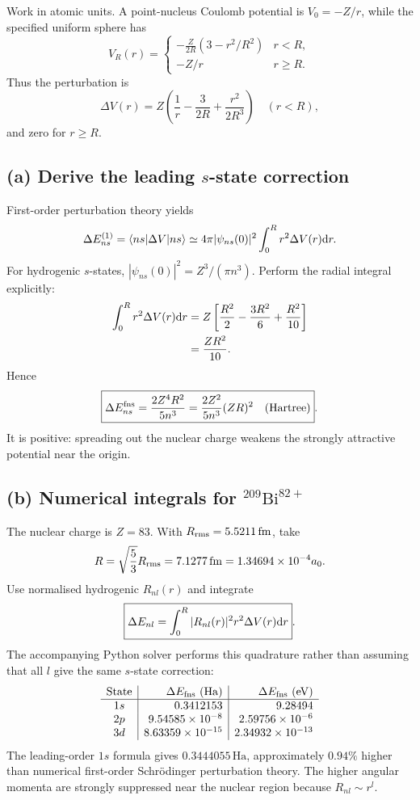 Work in atomic units. A point-nucleus Coulomb potential is
\(V_0=-Z/r\), while the specified uniform sphere has
\[
V_R(r)=
\begin{cases}
-\frac Z{2R}(3-r^2/R^2)&r<R,\\
-Z/r&r\ge R.
\end{cases}
\]
Thus the perturbation is
\[
\Delta V(r)=Z\left(\frac1r-\frac3{2R}
+\frac{r^2}{2R^3}\right)\quad(r<R),
\]
and zero for \(r\ge R\).

\subsection*{(a) Derive the leading \(s\)-state correction}
First-order perturbation theory yields
\[
\Delta E_{ns}^{(1)}
=\left\langle ns\middle\vert \Delta V\middle\vert ns\right\rangle
\simeq4\pi|\psi_{ns}(0)|^2\int_0^R
r^2\Delta V(r)\mathrm{d} r .
\]
For hydrogenic \(s\)-states,
\(|\psi_{ns}(0)|^2=Z^3/(\pi n^3)\).
Perform the radial integral explicitly:
\[
\begin{aligned}
\int_0^R r^2\Delta V(r)\mathrm{d} r
&=Z\left[\frac{R^2}{2}
-\frac{3R^2}{6}+\frac{R^2}{10}\right]\\
&=\frac{ZR^2}{10}.
\end{aligned}
\]
Hence
\[
\boxed{\Delta E_{ns}^{\rm fns}
=\frac{2Z^4R^2}{5n^3}
=\frac{2Z^2}{5n^3}(ZR)^2\quad(\text{Hartree})}.
\]
It is positive: spreading out the nuclear charge
weakens the strongly attractive potential near the origin.

\subsection*{(b) Numerical integrals for \(^{209}\mathrm{Bi}^{82+}\)}
The nuclear charge is \(Z=83\). With
\(R_{\rm rms}=5.5211\,\mathrm{fm}\), take
\[
R=\sqrt{\frac53}R_{\rm rms}=7.1277\,\mathrm{fm}
=1.34694\times10^{-4}a_0.
\]
Use normalised hydrogenic \(R_{nl}(r)\) and integrate
\[
\boxed{\Delta E_{nl}=\int_0^R
|R_{nl}(r)|^2r^2\Delta V(r)\mathrm{d} r}.
\]
The accompanying Python solver performs this
quadrature rather than assuming that all \(l\) give
the same \(s\)-state correction:
\[
\begin{array}{c|r|r}
\text{State}&\Delta E_{\rm fns}\ (\mathrm{Ha})&
\Delta E_{\rm fns}\ (\mathrm{eV})\\\hline
1s&0.3412153&9.28494\\
2p&9.54585\times10^{-8}&2.59756\times10^{-6}\\
3d&8.63359\times10^{-15}&2.34932\times10^{-13}
\end{array}
\]
The leading-order \(1s\) formula gives
\(0.3444055\,\mathrm{Ha}\), approximately
\(0.94\%\) higher than numerical first-order
Schr\"odinger perturbation theory. The higher
angular momenta are strongly suppressed near
the nuclear region because \(R_{nl}\sim r^l\).

